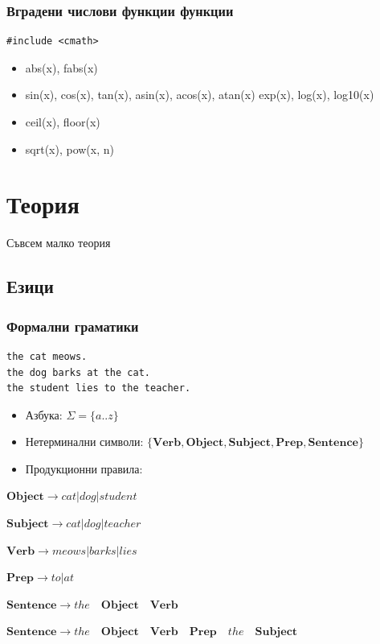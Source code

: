 \documentclass{beamer}
\begin{document}
\begin{frame}[fragile]
\frametitle{Вградени числови функции функции}


\begin{lstlisting}
#include <cmath>
\end{lstlisting}

\pause

\begin{itemize}
\item abs(x), fabs(x)
\item sin(x), cos(x), tan(x), asin(x), acos(x), atan(x) exp(x), log(x), log10(x)
\item ceil(x), floor(x)
\item sqrt(x), pow(x, n)

\end{itemize}


\end{frame}



\section{Теория}

\begin{frame}
\centerline{Съвсем малко теория}
\end{frame}


\subsection{Езици}


\begin{frame}[fragile]
\frametitle{Формални граматики}

\begin{verbatim}
the cat meows.
the dog barks at the cat.
the student lies to the teacher.
\end{verbatim}

\pause

\begin{itemize}
  \item Азбука: $\Sigma=\{a..z\}$
  \item Нетерминални символи: $\{\mathbf{Verb},\mathbf{Object},\mathbf{Subject}, \mathbf{Prep}, \mathbf{Sentence}\}$
  \item Продукционни правила:
\end{itemize}

\pause

$\mathbf{Object} \rightarrow cat | dog | student$

$\mathbf{Subject} \rightarrow cat | dog | teacher$

$\mathbf{Verb} \rightarrow meows | barks | lies$

$\mathbf{Prep} \rightarrow to | at$

$\mathbf{Sentence} \rightarrow the  \quad \mathbf{Object} \quad  \mathbf{Verb}$

$\mathbf{Sentence} \rightarrow the \quad \mathbf{Object}  \quad\mathbf{Verb}  \quad\mathbf{Prep} \quad the \quad \mathbf{Subject}$



\end{frame}
\end{document}
